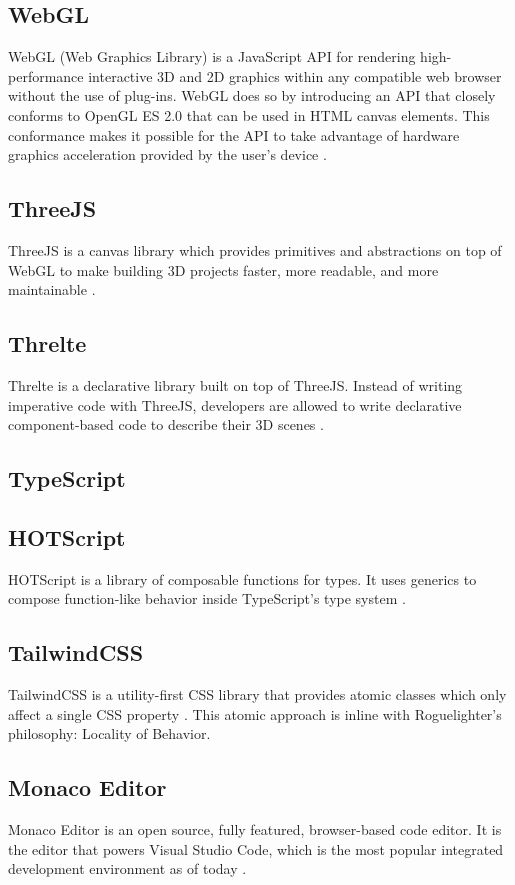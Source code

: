 \documentclass{article}
\begin{document}
\subsection{WebGL}
WebGL (Web Graphics Library) is a JavaScript API for rendering high-performance interactive 3D and 2D graphics within any compatible web browser without the use of plug-ins. WebGL does so by introducing an API that closely conforms to OpenGL ES 2.0 that can be used in HTML canvas elements. This conformance makes it possible for the API to take advantage of hardware graphics acceleration provided by the user's device \cite{webgl}. 

\subsection{ThreeJS}
ThreeJS is a canvas library which provides primitives and abstractions on top of WebGL to make building 3D projects faster, more readable, and more maintainable \cite{threejs}.

\subsection{Threlte}
Threlte is a declarative library built on top of ThreeJS. Instead of writing imperative code with ThreeJS, developers are allowed to write declarative component-based code to describe their 3D scenes \cite{threlte}.

\subsection{TypeScript}

\subsection{HOTScript}
HOTScript is a library of composable functions for types. It uses generics to compose function-like behavior inside TypeScript’s type system \cite{hotscript}.

\subsection{TailwindCSS}
TailwindCSS is a utility-first CSS library that provides atomic classes which only affect a single CSS property . This atomic approach is inline with Roguelighter's philosophy: Locality of Behavior\cite{tailwindcss}.

\subsection{Monaco Editor}
Monaco Editor is an open source, fully featured, browser-based code editor. It is the editor that powers Visual Studio Code, which is the most popular integrated development environment as of today \cite{monaco-editor}\cite{developer-survey}.
\end{document}
